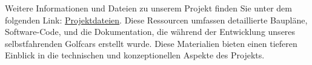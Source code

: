 Weitere Informationen und Dateien zu unserem Projekt finden Sie unter dem folgenden Link: \href{https://golfcar.space/Downloads/files/}{Projektdateien}. Diese Ressourcen umfassen detaillierte Baupläne, Software-Code, und die Dokumentation, die während der Entwicklung unseres selbstfahrenden Golfcars erstellt wurde. Diese Materialien bieten einen tieferen Einblick in die technischen und konzeptionellen Aspekte des Projekts.
